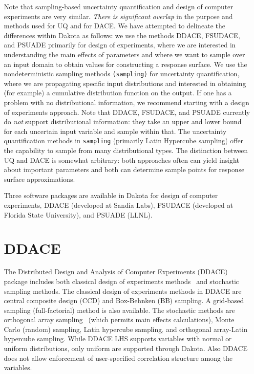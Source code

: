 Note that sampling-based uncertainty quantification and design of
computer experiments are very similar.  \emph{There is significant
overlap} in the purpose and methods used for UQ and for DACE.  We have
attempted to delineate the differences within Dakota as follows: we
use the methods DDACE, FSUDACE, and PSUADE primarily for design of
experiments, where we are interested in understanding the main effects
of parameters and where we want to sample over an input domain to
obtain values for constructing a response surface.  We use the
nondeterministic sampling methods \texttt{(sampling)} for
uncertainty quantification, where we are propagating specific input
distributions and interested in obtaining (for example) a cumulative
distribution function on the output.  If one has a problem with no
distributional information, we recommend starting with a design of
experiments approach.  Note that DDACE, FSUDACE, and PSUADE currently
do \emph{not} support distributional information: they take an upper
and lower bound for each uncertain input variable and sample within
that.  The uncertainty quantification methods in
\texttt{sampling} (primarily Latin Hypercube sampling) offer the
capability to sample from many distributional types.  The distinction
between UQ and DACE is somewhat arbitrary: both approaches often can
yield insight about important parameters and both can determine sample
points for response surface approximations.

Three software packages are available in Dakota for design of computer
experiments, DDACE (developed at Sandia Labs), FSUDACE (developed at
Florida State University), and PSUADE (LLNL).

\section{DDACE}\label{dace:ddace}

The Distributed Design and Analysis of Computer Experiments (DDACE)
package includes both classical design of experiments
methods~\cite{TonXX} and stochastic sampling methods. The classical
design of experiments methods in DDACE are central composite design
(CCD) and Box-Behnken (BB) sampling. A grid-based sampling
(full-factorial) method is also available. The stochastic methods are
orthogonal array sampling~\cite{Koe96} (which permits main effects
calculations), Monte Carlo (random) sampling, Latin hypercube
sampling, and orthogonal array-Latin hypercube sampling.  While DDACE
LHS supports variables with normal or uniform distributions, only
uniform are supported through Dakota.  Also DDACE does not allow
enforcement of user-specified correlation structure among the
variables.

